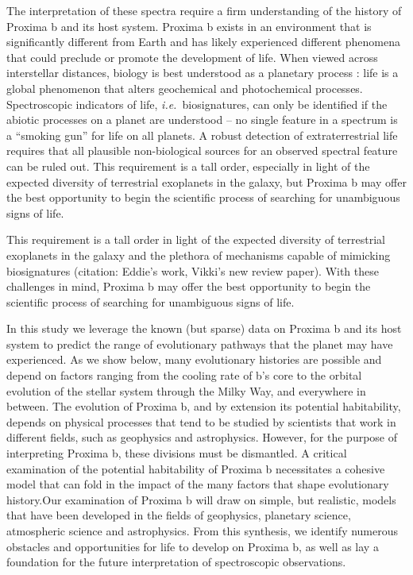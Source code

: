 \documentclass[preprint,12pt]{aastex}
\newcommand{\xxx}[1]{{\color{red} #1}} %
\newcommand{\xxx}[1]{{\color{red} #1}} %
\def\ie{{\it i.e.\ }}
\begin{document}
The interpretation of these spectra require a firm understanding of
the history of Proxima b and its host system. Proxima b exists in an
environment that is significantly different from Earth and has likely
experienced different phenomena that could preclude or promote the
development of life. When viewed across interstellar distances,
biology is best understood as a planetary process \xxx{:} life is a global
phenomenon that alters geochemical and photochemical
processes. Spectroscopic indicators of life, \ie biosignatures, can
only be identified if the abiotic processes on a planet are understood
-- no single feature in a spectrum is a ``smoking gun'' for life on
all planets. A robust detection of extraterrestrial life requires that
all plausible non-biological sources for an observed spectral
feature can be ruled out. This requirement is a tall order,
especially in light of the expected diversity of terrestrial
exoplanets in the galaxy, but Proxima b may offer the best opportunity
to begin the scientific process of searching for unambiguous signs of
life.

\xxx{This requirement is a tall order in light of the expected diversity of terrestrial
exoplanets in the galaxy and the plethora of mechanisms capable of mimicking biosignatures (citation: Eddie's
work, Vikki's new review paper).  With these challenges in mind, Proxima b may offer the best opportunity
to begin the scientific process of searching for unambiguous signs of
life.}

In this study we leverage the known (but sparse) data on Proxima b and
its host system to predict the range of evolutionary pathways that the
planet may have experienced. As we show below, many \xxx{evolutionary} histories are
possible and depend on factors ranging from the cooling rate of b's
core to the orbital evolution of the stellar system through the Milky
Way, \xxx{and everywhere in between}. The evolution of Proxima b, and by
extension its potential habitability, depends on physical processes
that tend to be studied by scientists that work in different
fields, such as geophysics and astrophysics. However, for the purpose
of interpreting Proxima b, these divisions must be dismantled. \xxx{A critical examination of the potential habitability of Proxima b necessitates
a cohesive model that can fold in the impact of the many factors that shape evolutionary
history.}Our examination of Proxima b will draw on simple, but realistic, models
that have been developed in the fields of geophysics, planetary
science, atmospheric science and astrophysics. From this synthesis, we
identify numerous obstacles and opportunities for life to develop on
Proxima b, as well as lay a foundation for the future interpretation
of spectroscopic observations.
\end{document}
